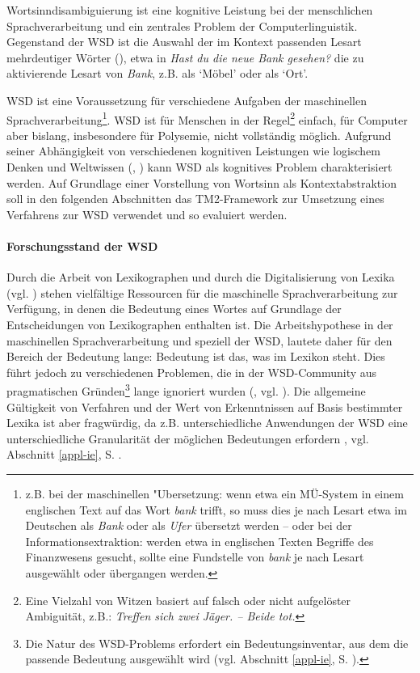 \documentclass[abstracton, 12pt]{scrartcl}
\begin{document}
Wortsinndisambiguierung ist eine kognitive Leistung bei der men\-sch\-lich\-en Sprach\-ver\-arbeitung und ein zentrales Problem der Computerlinguistik. Gegenstand der WSD ist die Auswahl der im Kontext passenden Lesart mehrdeutiger Wörter (\citealt{AgirreAndEdmonds2006a}), etwa in \emph{Hast du die neue Bank gesehen?} die zu aktivierende Lesart von \emph{Bank}, z.B. als `Möbel' oder als `Ort'.

WSD ist eine Voraussetzung für verschiedene Aufgaben der maschinellen Sprachverarbeitung\footnote{z.B. bei der maschinellen "Ubersetzung: wenn etwa ein MÜ-System in einem englischen Text auf das Wort \emph{bank} trifft, so muss dies je nach Lesart etwa im Deutschen als \emph{Bank} oder als \emph{Ufer} übersetzt werden -- oder bei der Informationsextraktion: werden etwa in englischen Texten Begriffe des Finanzwesens gesucht, sollte eine Fundstelle von \emph{bank} je nach Lesart ausgewählt oder übergangen werden.}. WSD ist für Menschen in der Regel\footnote{Eine Vielzahl von Witzen basiert auf falsch oder nicht aufgelöster Ambiguität, z.B.: \emph{Treffen sich zwei Jäger. -- Beide tot.}} einfach, für Computer aber bislang, insbesondere für Polysemie, nicht vollständig möglich. Aufgrund seiner Abhängigkeit von verschiedenen kognitiven Leistungen wie logischem Denken und Weltwissen (\citealt[2]{IdeAndVeronis1998}, \citealt[1]{AgirreAndEdmonds2006a}) kann WSD als kognitives Problem charakterisiert werden. Auf Grundlage einer Vorstellung von Wortsinn als Kontextabstraktion soll in den folgenden Abschnitten das TM2-Framework zur Umsetzung eines Verfahrens zur WSD verwendet und so evaluiert werden.

\paragraph{Forschungsstand der WSD} \label{chapter-wsd-stand}

Durch die Arbeit von Lexikographen und durch die Digitalisierung von Lexika (vgl. \citealt[vii]{WilksEtAl1996}) stehen vielfältige Ressourcen für die maschinelle Sprachverarbeitung zur Verfügung, in denen die Bedeutung eines Wortes auf Grundlage der Entscheidungen von Lexikographen enthalten ist. Die Arbeitshypothese in der maschinellen Sprachverarbeitung und speziell der WSD, lautete daher für den Bereich der Bedeutung lange: Bedeutung ist das, was im Lexikon steht. Dies führt jedoch zu verschiedenen Problemen, die in der WSD-Community aus pragmatischen Gründen\footnote{Die Natur des WSD-Problems erfordert ein Bedeutungsinventar, aus dem die passende Bedeutung ausgewählt wird (vgl. Abschnitt \ref{appl-ie}, S. \pageref{appl-ie}).} lange ignoriert wurden (\citealt[9]{AgirreAndEdmonds2006b}, vgl. \citealt{Kilgarriff2006}). Die allgemeine Gültigkeit von Verfahren und der Wert von Erkenntnissen auf Basis bestimmter Lexika ist aber fragwürdig, da z.B. unterschiedliche Anwendungen der WSD eine unterschiedliche Granularität der möglichen Bedeutungen erfordern \citep[58]{IdeAndWilks2006}, vgl. Abschnitt \ref{appl-ie}, S. \pageref{appl-ie}.
\end{document}
